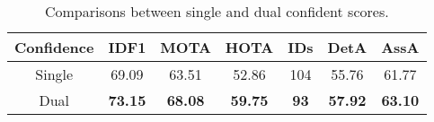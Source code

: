 \begin{table}
\footnotesize
\begin{tabular}{c|cccccc}
\toprule[1.5pt]
        \textbf{Confidence} & \textbf{IDF1} & \textbf{MOTA} & \textbf{HOTA} & \textbf{IDs}& \textbf{DetA} & \textbf{AssA} \\\hline
        Single& 69.09& 63.51& 52.86& 104& 55.76 & 61.77\\
        Dual & \textbf{73.15}& \textbf{68.08}& \textbf{59.75} & \textbf{93} & \textbf{57.92} & \textbf{63.10}\\
\bottomrule[1.5pt]
    \end{tabular}
\vspace{-2.0mm}
\caption{Comparisons between single and dual confident scores.}
\label{tab:ablation:novelty}
\vspace{-2.0mm}
\end{table}